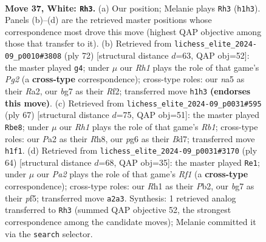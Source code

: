\documentclass[11pt]{article}
\begin{document}
\clearpage

\begin{figure}[p]\centering
\begin{subfigure}{0.46\textwidth}\centering
\resizebox{\linewidth}{!}{%
\newchessgame
\chessboard[
  setfen={r5r1/5kbp/p2p2p1/n3p1P1/1p2P2P/1P3PB1/P1PK2B1/R6R w - - 3 37},
  showmover=false,
  pgfstyle=straightmove, color=movearrow, markmove={h1-h3}
]}
\caption{}
\end{subfigure}\hfill
\begin{subfigure}{0.46\textwidth}\centering
\resizebox{\linewidth}{!}{%
\newchessgame
\chessboard[
  setfen={1r6/3bkpp1/1r1p4/2pBpPp1/p3P3/2PP3P/RP3RPK/8 w - - 0 37},
  showmover=false,
  pgfstyle=straightmove, color=movearrow, markmove={g2-g4}
]}
\caption{}
\end{subfigure}
\\[4pt]
\begin{subfigure}{0.46\textwidth}\centering
\resizebox{\linewidth}{!}{%
\newchessgame
\chessboard[
  setfen={1r5r/3b4/1p1b1k2/p1pB1pp1/2Pp4/P2P1NP1/1P4KP/1R2R3 b - - 3 34},
  showmover=false,
  pgfstyle=straightmove, color=movearrow, markmove={b8-e8}
]}
\caption{}
\end{subfigure}\hfill
\begin{subfigure}{0.46\textwidth}\centering
\resizebox{\linewidth}{!}{%
\newchessgame
\chessboard[
  setfen={3r1k2/1b2r3/p5p1/P3pp1p/2Bp4/3P1P1P/1PPR2P1/5RK1 w - - 0 33},
  showmover=false,
  pgfstyle=straightmove, color=movearrow, markmove={f1-e1}
]}
\caption{}
\end{subfigure}
\caption{\textbf{Move 37, White: \texttt{Rh3}.} (a) Our position; Melanie plays \texttt{Rh3} (\texttt{h1h3}). Panels (b)--(d) are the retrieved master positions whose correspondence most drove this move (highest QAP objective among those that transfer to it). (b) Retrieved from \texttt{lichess\_elite\_2024-09\_p0010\#3808} (ply 72) [structural distance $d$=63, QAP obj=52]: the master played \texttt{g4}; under $\mu$ our \emph{Rh1} plays the role of that game's \emph{Pg2} (a \textbf{cross-type} correspondence); cross-type roles: our \emph{n}a5 as their \emph{R}a2, our \emph{b}g7 as their \emph{R}f2; transferred move \texttt{h1h3} \textbf{(endorses this move)}. (c) Retrieved from \texttt{lichess\_elite\_2024-09\_p0031\#595} (ply 67) [structural distance $d$=75, QAP obj=51]: the master played \texttt{Rbe8}; under $\mu$ our \emph{Rh1} plays the role of that game's \emph{Rb1}; cross-type roles: our \emph{P}a2 as their \emph{R}h8, our \emph{p}g6 as their \emph{B}d7; transferred move \texttt{h1f1}. (d) Retrieved from \texttt{lichess\_elite\_2024-09\_p0031\#3170} (ply 64) [structural distance $d$=68, QAP obj=35]: the master played \texttt{Re1}; under $\mu$ our \emph{Pa2} plays the role of that game's \emph{Rf1} (a \textbf{cross-type} correspondence); cross-type roles: our \emph{R}h1 as their \emph{P}b2, our \emph{b}g7 as their \emph{p}f5; transferred move \texttt{a2a3}. Synthesis: 1 retrieved analog transferred to \texttt{Rh3} (summed QAP objective 52, the strongest correspondence among the candidate moves); Melanie committed it via the \texttt{search} selector.}
\label{fig:thought-m72}
\end{figure}
\end{document}
